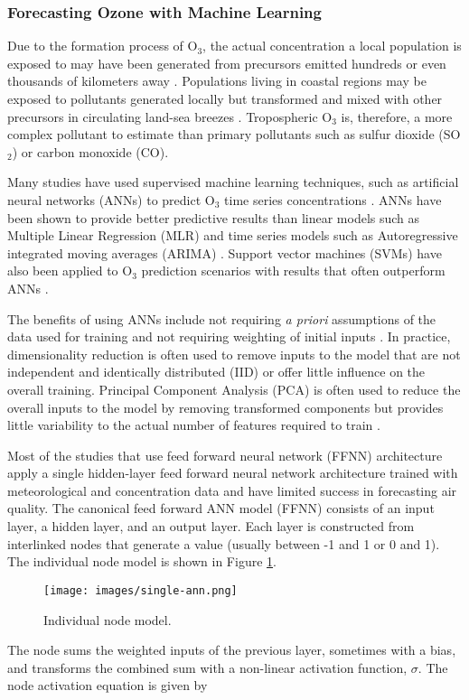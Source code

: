 \subsubsection{Forecasting Ozone with Machine Learning}

Due to the formation process of O$_{3}$, the actual concentration a local population is exposed to may have been generated from precursors emitted hundreds or even thousands of kilometers away \citep{Glavas2011}. Populations living in coastal regions may be exposed to pollutants generated locally but transformed and mixed with other precursors in circulating land-sea breezes \citep{Freeman2017a}. Tropospheric O$_{3}$ is, therefore, a more complex pollutant to estimate than primary pollutants such as sulfur dioxide (SO$_{2}$) or carbon monoxide (CO).

Many studies have used supervised machine learning techniques, such as artificial neural networks (ANNs) to predict O$_{3}$ time series concentrations \citep{Comrie1997, Dorling2003, Ettouney2009a, Kurt2008, Biancofiore2017}. ANNs have been shown to provide better predictive results than linear models such as Multiple Linear Regression (MLR) and time series models such as Autoregressive integrated moving averages (ARIMA) \citep{Gardner1998, Prybutok2000}. Support vector machines (SVMs) have also been applied to O$_{3}$ prediction scenarios with results that often outperform ANNs \citep{Luna2014, Papaleondias2013, Singh2013}. 

The benefits of using ANNs include not requiring \textit{a priori} assumptions of the data used for training and not requiring weighting of initial inputs \citep{Gardner1998}. In practice, dimensionality reduction is often used to remove inputs to the model that are not independent and identically distributed (IID) or offer little influence on the overall training. Principal Component Analysis (PCA) is often used to reduce the overall inputs to the model by removing transformed components but provides little variability to the actual number of features required to train \citep{Singh2013, Wang2015a}.

Most of the studies that use feed forward neural network (FFNN) architecture apply a single hidden-layer feed forward neural network architecture trained with meteorological and concentration data and have limited success in forecasting air quality. The canonical feed forward ANN model (FFNN) consists of an input layer, a hidden layer, and an output layer. Each layer is constructed from interlinked nodes that generate a value (usually between -1 and 1 or 0 and 1). The individual node model is shown in Figure \ref{fig:SingleANN}. \\
%
\begin{figure}[H]
\centering
\texttt{[image: images/single-ann.png]} 
\caption{Individual node model.}
\label{fig:SingleANN}
\end{figure}
%
The node sums the weighted inputs of the previous layer, sometimes with a bias, and transforms the combined sum with a non-linear activation function, $\sigma$. The node activation equation is given by


